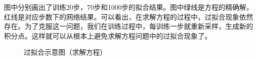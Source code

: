 图中分别画出了训练20步，70步和1000步的拟合结果。图中绿线是方程的精确解，红线是对应步数下的网络结果。可以看出，在求解方程的过程中，过拟合现象依然存在。为了克服这一问题，我们在训练过程中，每训练一步就重新采样，生成新的积分点。这样就可以从根本上避免求解方程问题中的过拟合现象了。
\begin{figure}[htbp]
\centering
{}
\caption{过拟合示意图（求解方程）}
\label{fig1-2}
\end{figure}
